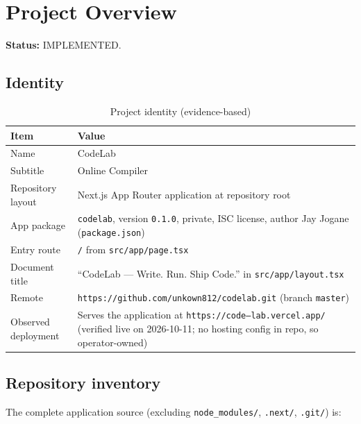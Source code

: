 \section{Project Overview}
\label{sec:project-overview}

\textbf{Status:} IMPLEMENTED.

\subsection{Identity}
\begin{table}[H]
\centering
\caption{Project identity (evidence-based)}
\begin{tabular}{|l|p{9cm}|}
\hline
\textbf{Item} & \textbf{Value} \\ \hline
Name & CodeLab \\ \hline
Subtitle & Online Compiler \\ \hline
Repository layout & Next.js App Router application at repository root \\ \hline
App package & \texttt{codelab}, version \texttt{0.1.0}, private, ISC license, author Jay Jogane (\texttt{package.json}) \\ \hline
Entry route & \texttt{/} from \texttt{src/app/page.tsx} \\ \hline
Document title & ``CodeLab --- Write. Run. Ship Code.'' in \texttt{src/app/layout.tsx} \\ \hline
Remote & \texttt{https://github.com/unkown812/codelab.git} (branch \texttt{master}) \\ \hline
Observed deployment & Serves the application at \texttt{https://code--lab.vercel.app/} (verified live on 2026-10-11; no hosting config in repo, so operator-owned) \\ \hline
\end{tabular}
\end{table}

\subsection{Repository inventory}
The complete application source (excluding \texttt{node\_modules/}, \texttt{.next/}, \texttt{.git/}) is:

